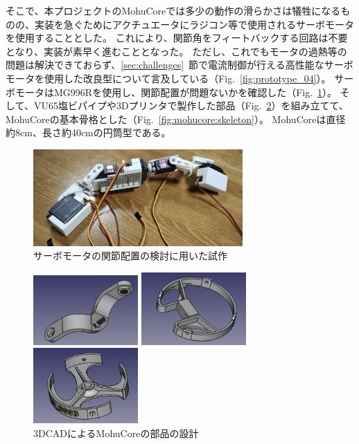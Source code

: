 \documentclass[uplatex,a4paper,12pt]{jsarticle}
\renewcommand{\figurename}{Fig.}
\newcommand{\figref}[1]{\figurename~\ref{#1}}
\begin{document}
そこで、本プロジェクトのMohuCoreでは多少の動作の滑らかさは犠牲になるものの、実装を急ぐためにアクチュエータにラジコン等で使用されるサーボモータを使用することとした。
これにより、関節角をフィートバックする回路は不要となり、実装が素早く進むこととなった。
ただし、これでもモータの過熱等の問題は解決できておらず、\ref{sec:challenges}~節で電流制御が行える高性能なサーボモータを使用した改良型について言及している（\figref{fig:prototype_04}）。
サーボモータはMG996Rを使用し、関節配置が問題ないかを確認した（\figref{fig:prototype_02}）。
そして、VU65塩ビパイプや3Dプリンタで製作した部品（\figref{fig:mohucore:cad}）を組み立てて、MohuCoreの基本骨格とした（\figref{fig:mohucore:skeleton}）。
MohuCoreは直径約8cm、長さ約40cmの円筒型である。

\begin{figure}[htbp]
  \centering
  \includegraphics[width=8cm]{images/prototype/prototype_02.jpg}
  \caption{サーボモータの関節配置の検討に用いた試作}
  \label{fig:prototype_02}
\end{figure}

\begin{figure}[htbp]
  \centering
  \begin{minipage}[c]{0.32\linewidth}
    \centering
    \includegraphics[keepaspectratio,width=4cm,clip]{images/mohucore/part_k.png}
  \end{minipage}
  \begin{minipage}[c]{0.32\linewidth}
    \centering
    \includegraphics[keepaspectratio,width=4cm,clip]{images/mohucore/part_l.png}
  \end{minipage}
  \begin{minipage}[c]{0.32\linewidth}
    \centering
    \includegraphics[keepaspectratio,width=4cm,clip]{images/mohucore/part_m.png}
  \end{minipage}
  \caption{3DCADによるMohuCoreの部品の設計}
  \label{fig:mohucore:cad}
\end{figure}
\end{document}
